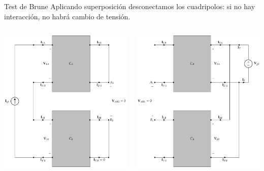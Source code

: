 \documentclass[xcolor={usenames,svgnames,dvipsnames}]{beamer}
\begin{document}
\begin{frame}[label={sec:org0866253},plain]{Test de Brune}
Aplicando superposición desconectamos los cuadripolos: \alert{si no hay interacción, no habrá cambio de tensión}.
\begin{columns}
\begin{column}{0.65\columnwidth}
\begin{center}
\includegraphics[width=.9\linewidth]{figs/serie-paralelo-brune-entrada.pdf}
\end{center}
\end{column}
\begin{column}{0.65\columnwidth}
\begin{center}
\includegraphics[width=.9\linewidth]{figs/serie-paralelo-brune-salida.pdf}
\end{center}
\end{column}
\end{columns}
\end{frame}
\end{document}
